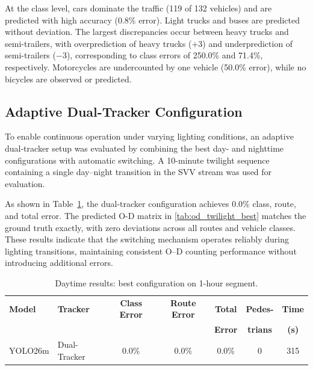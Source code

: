 At the class level, cars dominate the traffic (119 of 132 vehicles) and are predicted with high accuracy (0.8\% error). Light trucks and buses are predicted without deviation. The largest discrepancies occur between heavy trucks and semi-trailers, with overprediction of heavy trucks ($+3$) and underprediction of semi-trailers ($-3$), corresponding to class errors of 250.0\% and 71.4\%, respectively. Motorcycles are undercounted by one vehicle (50.0\% error), while no bicycles are observed or predicted.

\subsection{Adaptive Dual-Tracker Configuration}

To enable continuous operation under varying lighting conditions, an adaptive dual-tracker setup was evaluated by combining the best day- and nighttime configurations with automatic switching. A 10-minute twilight sequence containing a single day–night transition in the SVV stream was used for evaluation.

As shown in Table~\ref{tab:od_transition}, the dual-tracker configuration achieves 0.0\% class, route, and total error. The predicted O-D matrix in \autoref{tab:od_twilight_best} matches the ground truth exactly, with zero deviations across all routes and vehicle classes.
These results indicate that the switching mechanism operates reliably during lighting transitions, maintaining consistent O–D counting performance without introducing additional errors.

\begin{table}[H]
\caption{Daytime results: best configuration on 1-hour segment.}
\centering
\small
\begin{tabular}{l l c c c c c}
\toprule
\textbf{Model} & \textbf{Tracker} & \textbf{Class Error} & \textbf{Route Error} & \textbf{Total} & \textbf{Pedes-} & \textbf{Time} \\
& & & & \textbf{Error} & \textbf{trians} & \textbf{(s)} \\
\midrule
YOLO26m & Dual-Tracker & 0.0\% & 0.0\% & 0.0\% & 0 & 315 \\
\bottomrule
\end{tabular}

\label{tab:od_transition}
\end{table}


